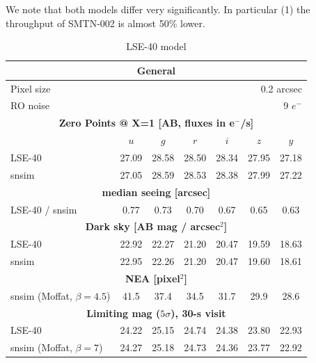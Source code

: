 \documentclass[\docopts]{\docclass}
\begin{document}
We note that both models differ very significantly. In particular (1)
the throughput of SMTN-002 is almost 50\% lower.


\begin{table}
\begin{center}
\caption{LSE-40 model}
\label{tab:lse40}
\begin{tabular}{l|cccccc}
\hline 
\hline 
\multicolumn{7}{c}{{\bf General}} \\
\hline
Pixel size & \multicolumn{6}{r}{0.2 arcsec} \\
RO noise   & \multicolumn{6}{r}{9 $e^-$}    \\
\hline
\multicolumn{7}{c}{{\bf Zero Points @ X=1 [AB, fluxes in e$^-$/s]}} \\
\hline
           &  $u$ & $g$ & $r$ & $i$ & $z$ & $y$ \\
LSE-40     & 27.09 & 28.58 & 28.50 & 28.34 & 27.95 & 27.18 \\
snsim      & 27.05 & 28.59 & 28.53 & 28.38 & 27.99 & 27.22 \\
\hline
\multicolumn{7}{c}{{\bf median seeing [arcsec]}} \\
\hline
LSE-40 / snsim  &  0.77 &  0.73 &  0.70 &  0.67 &  0.65 &  0.63 \\
\hline
\multicolumn{7}{c}{{\bf Dark sky [AB mag / arcsec$^2$]}}   \\
\hline
LSE-40     & 22.92 & 22.27 & 21.20 & 20.47 & 19.59 & 18.63 \\
snsim      & 22.95 & 22.26 & 21.20 & 20.47 & 19.60 & 18.61 \\
\hline
\multicolumn{7}{c}{{\bf NEA [pixel$^2$]}}   \\
\hline
snsim (Moffat, $\beta=4.5$)     & 41.5  & 37.4  & 34.5  & 31.7 & 29.9  & 28.6  \\
\hline
\multicolumn{7}{c}{{\bf Limiting mag ($5 \sigma$), 30-s visit}}   \\
\hline
LSE-40                        & 24.22  &  25.15 &  24.74  &  24.38  &  23.80  &  22.93  \\
snsim (Moffat, $\beta=7$)     & 24.27  &  25.18 &  24.73  &  24.36  &  23.77  &  22.92  \\
\hline
\end{tabular}
\end{center}
\end{table}
\end{document}
